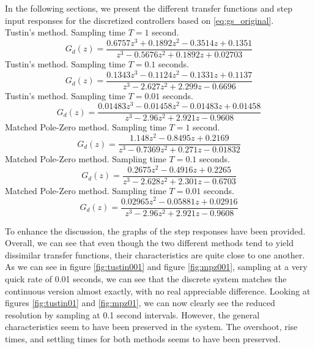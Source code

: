 \documentclass[a4paper, 12pt]{article}
\begin{document}
In the following sections, we present the different transfer functions and step
input responses for the discretized controllers based on \eqref{eq:gs_original}.\\

\noindent Tustin's method. Sampling time $T = 1$ second.
\begin{equation}
  G_d(z) = \frac{0.6757 z^3 + 0.1892 z^2 - 0.3514 z + 0.1351}{z^3 - 0.5676 z^2 + 0.1892 z + 0.02703}
  \label{eq:tustin_1}
\end{equation}
\noindent Tustin's method. Sampling time $T = 0.1$ seconds.
\begin{equation}
  G_d(z) = \frac{0.1343 z^3 - 0.1124 z^2 - 0.1331 z + 0.1137}{z^3 - 2.627 z^2 + 2.299 z - 0.6696}
  \label{eq:tustin_01}
\end{equation}
\noindent Tustin's method. Sampling time $T = 0.01$ seconds.
\begin{equation}
  G_d(z) = \frac{0.01483 z^3 - 0.01458 z^2 - 0.01483 z + 0.01458}{z^3 - 2.96 z^2 + 2.921 z - 0.9608}
  \label{eq:tustin_001}
\end{equation}
\noindent Matched Pole-Zero method. Sampling time $T = 1$ second.
\begin{equation}
  G_d(z) = \frac{1.148 z^2 - 0.8495 z + 0.2169}{z^3 - 0.7369 z^2 + 0.271 z - 0.01832}
  \label{eq:mpz_1}
\end{equation}
\noindent Matched Pole-Zero method. Sampling time $T = 0.1$ seconds.
\begin{equation}
  G_d(z) = \frac{0.2675 z^2 - 0.4916 z + 0.2265}{z^3 - 2.628 z^2 + 2.301 z - 0.6703}
  \label{eq_mpz_01}
\end{equation}
\noindent Matched Pole-Zero method. Sampling time $T = 0.01$ seconds.
\begin{equation}
  G_d(z) = \frac{0.02965 z^2 - 0.05881 z + 0.02916}{z^3 - 2.96 z^2 + 2.921 z - 0.9608}
  \label{eq:mpz_001}
\end{equation}

To enhance the discussion, the graphs of the step responses have been provided.
Overall, we can see that even though the two different methods tend to yield
dissimilar transfer functions, their characteristics are quite close to one
another. As we can see in figure \ref{fig:tustin001} and figure
\ref{fig:mpz001}, sampling at a very quick rate of 0.01 seconds, we can see
that the discrete system matches the continuous version almost exactly, with no
real appreciable difference. Looking at figures \ref{fig:tustin01} and
\ref{fig:mpz01}, we can now clearly see the reduced resolution by sampling at
0.1 second intervals.  However, the general characteristics seem to have been
preserved in the system.  The overshoot, rise times, and settling times for
both methods seems to have been preserved.
\end{document}
